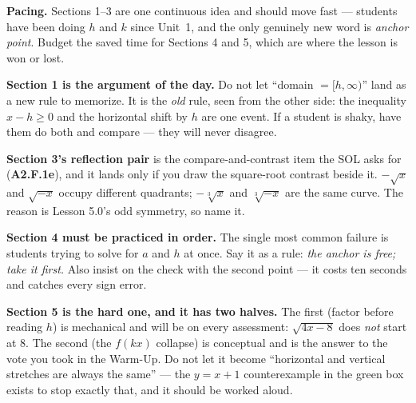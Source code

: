 \documentclass[10pt]{article}
\begin{document}
\begin{teachernote}
\small
\textbf{Pacing.} Sections 1--3 are one continuous idea and should move fast --- students have been
doing $h$ and $k$ since Unit~1, and the only genuinely new word is \emph{anchor point}. Budget the
saved time for Sections 4 and 5, which are where the lesson is won or lost.

\textbf{Section 1 is the argument of the day.} Do not let ``domain $=[h,\infty)$'' land as a new rule
to memorize. It is the \emph{old} rule, seen from the other side: the inequality
$x-h\ge0$ and the horizontal shift by $h$ are one event. If a student is shaky, have them do both and
compare --- they will never disagree.

\textbf{Section 3's reflection pair} is the compare-and-contrast item the SOL asks for
(\textbf{A2.F.1e}), and it lands only if you draw the square-root contrast beside it. $-\sqrt x$ and
$\sqrt{-x}$ occupy different quadrants; $-\sqrt[3]{x}$ and $\sqrt[3]{-x}$ are the same curve. The
reason is Lesson 5.0's odd symmetry, so name it.

\textbf{Section 4 must be practiced in order.} The single most common failure is students trying to
solve for $a$ and $h$ at once. Say it as a rule: \emph{the anchor is free; take it first.} Also
insist on the check with the second point --- it costs ten seconds and catches every sign error.

\textbf{Section 5 is the hard one, and it has two halves.} The first (factor before reading $h$) is
mechanical and will be on every assessment: $\sqrt{4x-8}$ does \emph{not} start at $8$. The second
(the $f(kx)$ collapse) is conceptual and is the answer to the vote you took in the Warm-Up. Do not
let it become ``horizontal and vertical stretches are always the same'' --- the $y=x+1$
counterexample in the green box exists to stop exactly that, and it should be worked aloud.
\end{teachernote}
\end{document}
